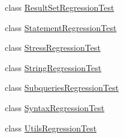 \begin{DoxyCompactItemize}
\item 
class \mbox{\hyperlink{classtestsuite_1_1regression_1_1_result_set_regression_test}{Result\+Set\+Regression\+Test}}
\item 
class \mbox{\hyperlink{classtestsuite_1_1regression_1_1_statement_regression_test}{Statement\+Regression\+Test}}
\item 
class \mbox{\hyperlink{classtestsuite_1_1regression_1_1_stress_regression_test}{Stress\+Regression\+Test}}
\item 
class \mbox{\hyperlink{classtestsuite_1_1regression_1_1_string_regression_test}{String\+Regression\+Test}}
\item 
class \mbox{\hyperlink{classtestsuite_1_1regression_1_1_subqueries_regression_test}{Subqueries\+Regression\+Test}}
\item 
class \mbox{\hyperlink{classtestsuite_1_1regression_1_1_syntax_regression_test}{Syntax\+Regression\+Test}}
\item 
class \mbox{\hyperlink{classtestsuite_1_1regression_1_1_utils_regression_test}{Utils\+Regression\+Test}}
\end{DoxyCompactItemize}
